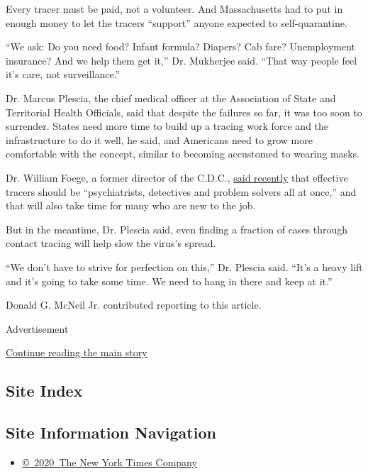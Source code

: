 Every tracer must be paid, not a volunteer. And Massachusetts had to put
in enough money to let the tracers ``support'' anyone expected to
self-quarantine.

``We ask: Do you need food? Infant formula? Diapers? Cab fare?
Unemployment insurance? And we help them get it,'' Dr. Mukherjee said.
``That way people feel it's care, not surveillance.''

Dr. Marcus Plescia, the chief medical officer at the Association of
State and Territorial Health Officials, said that despite the failures
so far, it was too soon to surrender. States need more time to build up
a tracing work force and the infrastructure to do it well, he said, and
Americans need to grow more comfortable with the concept, similar to
becoming accustomed to wearing masks.

Dr. William Foege, a former director of the C.D.C.,
\href{https://www.nytimes.com/2020/05/23/sunday-review/coronavirus-contact-tracing.html}{said
recently} that effective tracers should be ``psychiatrists, detectives
and problem solvers all at once,'' and that will also take time for many
who are new to the job.

But in the meantime, Dr. Plescia said, even finding a fraction of cases
through contact tracing will help slow the virus's spread.

``We don't have to strive for perfection on this,'' Dr. Plescia said.
``It's a heavy lift and it's going to take some time. We need to hang in
there and keep at it.''

Donald G. McNeil Jr. contributed reporting to this article.

Advertisement

\protect\hyperlink{after-bottom}{Continue reading the main story}

\hypertarget{site-index}{%
\subsection{Site Index}\label{site-index}}

\hypertarget{site-information-navigation}{%
\subsection{Site Information
Navigation}\label{site-information-navigation}}

\begin{itemize}
\tightlist
\item
  \href{https://help.nytimes.com/hc/en-us/articles/115014792127-Copyright-notice}{©~2020~The
  New York Times Company}
\end{itemize}

